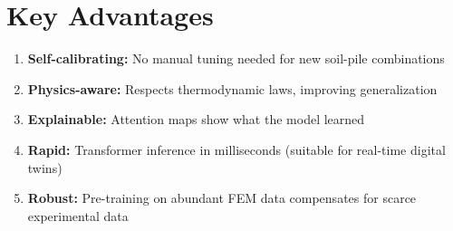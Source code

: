 \documentclass[11pt,a4paper]{article}
\begin{document}
\section{Key Advantages}

\begin{enumerate}
  \item \textbf{Self-calibrating:} No manual tuning needed for new soil-pile combinations
  \item \textbf{Physics-aware:} Respects thermodynamic laws, improving generalization
  \item \textbf{Explainable:} Attention maps show what the model learned
  \item \textbf{Rapid:} Transformer inference in milliseconds (suitable for real-time digital twins)
  \item \textbf{Robust:} Pre-training on abundant FEM data compensates for scarce experimental data
\end{enumerate}
\end{document}
